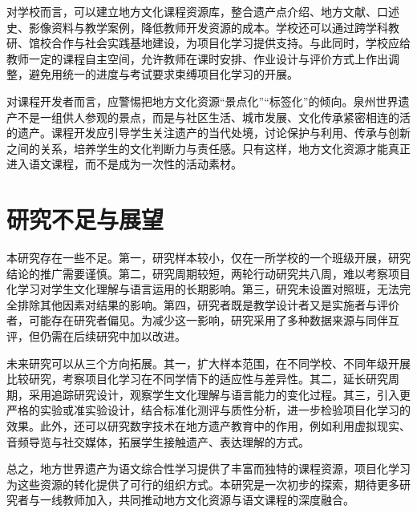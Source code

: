 对学校而言，可以建立地方文化课程资源库，整合遗产点介绍、地方文献、口述史、影像资料与教学案例，降低教师开发资源的成本。学校还可以通过跨学科教研、馆校合作与社会实践基地建设，为项目化学习提供支持。与此同时，学校应给教师一定的课程自主空间，允许教师在课时安排、作业设计与评价方式上作出调整，避免用统一的进度与考试要求束缚项目化学习的开展。

对课程开发者而言，应警惕把地方文化资源“景点化”“标签化”的倾向。泉州世界遗产不是一组供人参观的景点，而是与社区生活、城市发展、文化传承紧密相连的活的遗产。课程开发应引导学生关注遗产的当代处境，讨论保护与利用、传承与创新之间的关系，培养学生的文化判断力与责任感。只有这样，地方文化资源才能真正进入语文课程，而不是成为一次性的活动素材。

\section{研究不足与展望}

本研究存在一些不足。第一，研究样本较小，仅在一所学校的一个班级开展，研究结论的推广需要谨慎。第二，研究周期较短，两轮行动研究共八周，难以考察项目化学习对学生文化理解与语言运用的长期影响。第三，研究未设置对照班，无法完全排除其他因素对结果的影响。第四，研究者既是教学设计者又是实施者与评价者，可能存在研究者偏见。为减少这一影响，研究采用了多种数据来源与同伴互评，但仍需在后续研究中加以改进。

未来研究可以从三个方向拓展。其一，扩大样本范围，在不同学校、不同年级开展比较研究，考察项目化学习在不同学情下的适应性与差异性。其二，延长研究周期，采用追踪研究设计，观察学生文化理解与语言能力的变化过程。其三，引入更严格的实验或准实验设计，结合标准化测评与质性分析，进一步检验项目化学习的效果。此外，还可以研究数字技术在地方遗产教育中的作用，例如利用虚拟现实、音频导览与社交媒体，拓展学生接触遗产、表达理解的方式。

总之，地方世界遗产为语文综合性学习提供了丰富而独特的课程资源，项目化学习为这些资源的转化提供了可行的组织方式。本研究是一次初步的探索，期待更多研究者与一线教师加入，共同推动地方文化资源与语文课程的深度融合。
